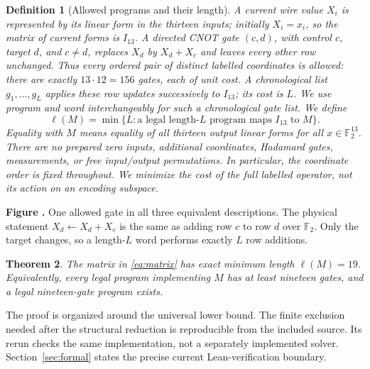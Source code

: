 \documentclass[11pt]{article}
\newtheorem{theorem}{Theorem}
\newtheorem{definition}[theorem]{Definition}
\newcommand{\F}{\mathbb F_2}
\newcommand{\cost}{\ell}
\newcommand{\prooffigure}[3]{%
  \begin{center}
  \begin{minipage}{.98\linewidth}
  \centering
  \resizebox{\linewidth}{!}{}\par
  \refstepcounter{figure}\label{#2}%
  \small\textbf{Figure \thefigure.} #3
  \end{minipage}
  \end{center}}
\begin{document}
\begin{definition}[Allowed programs and their length]\label{def:model}
A current wire value $X_i$ is represented by its linear form in the thirteen
inputs; initially $X_i=x_i$, so the matrix of current forms is $I_{13}$.
A directed CNOT gate $(c,d)$, with control $c$, target $d$, and $c\ne d$,
replaces $X_d$ by $X_d+X_c$ and leaves every other row unchanged. Thus every
ordered pair of distinct labelled coordinates is allowed: there are exactly
$13\cdot12=156$ gates, each of unit cost. A chronological list
$g_1,\ldots,g_L$ applies these row updates successively to $I_{13}$; its cost
is $L$. We use \emph{program} and \emph{word} interchangeably for such a
chronological gate list.
We define
\[
\cost(M)=\min\{L:\text{a legal length-$L$ program maps }I_{13}\text{ to }M\}.
\]
Equality with $M$ means equality of all thirteen output linear forms for all
$x\in\F^{13}$. There are no prepared zero inputs, additional coordinates,
Hadamard gates, measurements, or free input/output permutations. In
particular, the coordinate order is fixed throughout. We minimize the cost
of the full labelled operator, not its action on an encoding subspace.
\end{definition}
\prooffigure{cnot_semantics}{fig:cnot-semantics}{One allowed gate in all
three equivalent descriptions. The physical statement
$X_d\leftarrow X_d+X_c$ is the same as adding row $c$ to row $d$ over
$\F$. Only the target changes, so a length-$L$ word performs exactly $L$
row additions.}

\begin{theorem}\label{thm:main}
The matrix in \eqref{eq:matrix} has exact minimum length $\cost(M)=19$.
Equivalently, every legal program implementing $M$ has at least nineteen
gates, and a legal nineteen-gate program exists.
\end{theorem}
The proof is organized around the universal lower bound. The finite
exclusion needed after the structural reduction is reproducible from the
included source. Its rerun checks the same implementation, not a separately
implemented solver. Section~\ref{sec:formal} states the precise current
Lean-verification boundary.
\end{document}

